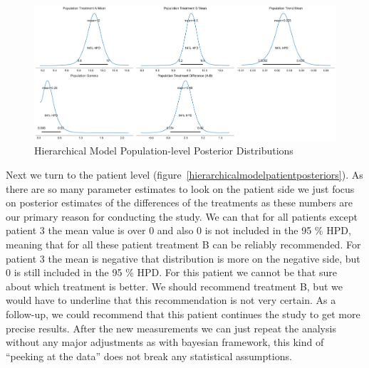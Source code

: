 \documentclass[12pt,a4paper,leqno]{report}
\theoremstyle{plain}
\theoremstyle{definition}
\theoremstyle{remark}
\begin{document}

\bigskip
\begin{figure}[H]
    \caption{Hierarchical Model Population-level Posterior Distributions}\label{hierarchicalmodelpopulationposteriors}
    \bigskip
    \includegraphics[width=\textwidth,height=\textheight,keepaspectratio]{hierarchical_model_population_level_posteriors.pdf}
\end{figure}
\bigskip

Next we turn to the patient level (figure\ \ref{hierarchicalmodelpatientposteriors}). As
there are so many parameter estimates to look on the patient side we just focus on
posterior estimates of the differences of the treatments as these numbers are our
primary reason for conducting the study. We can that for all patients except patient 3
the mean value is over 0 and also 0 is not included in the 95 \% HPD, meaning that for
all these patient treatment B can be reliably recommended. For patient 3 the mean is
negative that distribution is more on the negative side, but 0 is still included in the
95 \% HPD. For this patient we cannot be that sure about which treatment is better. We
should recommend treatment B, but we would have to underline that this recommendation is
not very certain. As a follow-up, we could recommend that this patient continues the
study to get more precise results. After the new measurements we can just repeat the
analysis without any major adjustments as with bayesian framework, this kind of
``peeking at the data'' does not break any statistical assumptions.
\end{document}
